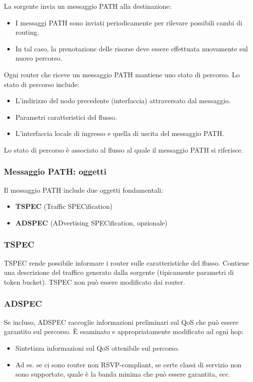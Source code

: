 La sorgente invia un messaggio PATH alla destinazione:
\begin{itemize}
	\item I messaggi PATH sono inviati periodicamente per rilevare possibili cambi di routing.
	\item In tal caso, la prenotazione delle risorse deve essere effettuata nuovamente sul nuovo percorso.
\end{itemize}

Ogni router che riceve un messaggio PATH mantiene uno stato di percorso. Lo stato di percorso include:
\begin{itemize}
	\item L'indirizzo del nodo precedente (interfaccia) attraversato dal messaggio.
	\item Parametri caratteristici del flusso.
	\item L'interfaccia locale di ingresso e quella di uscita del messaggio PATH.
\end{itemize}

Lo stato di percorso è associato al flusso al quale il messaggio PATH si riferisce.

\subsubsection{Messaggio PATH: oggetti}
Il messaggio PATH include due oggetti fondamentali:
\begin{itemize}
	\item \textbf{TSPEC} (Traffic SPECification)
	\item \textbf{ADSPEC} (ADvertising SPECification, opzionale)
\end{itemize}

\subsubsection{TSPEC}
TSPEC rende possibile informare i router sulle caratteristiche del flusso. Contiene una descrizione del traffico generato dalla sorgente (tipicamente parametri di token bucket). TSPEC non può essere modificato dai router.

\subsubsection{ADSPEC}
Se incluso, ADSPEC raccoglie informazioni preliminari sul QoS che può essere garantito sul percorso. È esaminato e appropriatamente modificato ad ogni hop:
\begin{itemize}
	\item Sintetizza informazioni sul QoS ottenibile sul percorso.
	\item Ad es. se ci sono router non RSVP-compliant, se certe classi di servizio non sono supportate, quale è la banda minima che può essere garantita, ecc.
\end{itemize}

